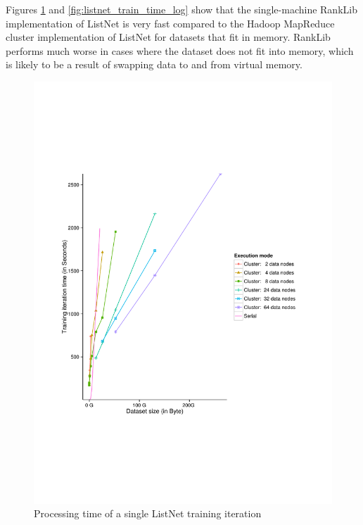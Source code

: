 Figures \ref{fig:listnet_train_time} and \ref{fig:listnet_train_time_log} show that the single-machine RankLib implementation of ListNet is very fast compared to the Hadoop MapReduce cluster implementation of ListNet for datasets that fit in memory. RankLib performs much worse in cases where the dataset does not fit into memory, which is likely to be a result of swapping data to and from virtual memory.

\begin{figure}[!h]
\centering
\includegraphics[trim=0cm 5cm 0cm 5cm, scale=0.7]{gfx/time_single.pdf}
\caption{Processing time of a single ListNet training iteration}
\label{fig:listnet_train_time}
\end{figure}

